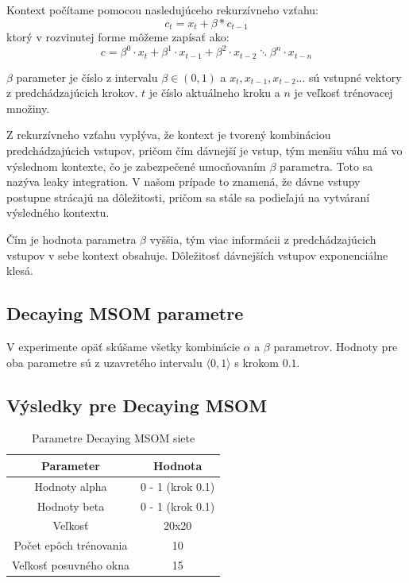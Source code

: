 Kontext počítame pomocou nasledujúceho rekurzívneho vzťahu:
\begin{equation} \label{dm_recursive}
    c_{t} = x_{t} + \beta * c_{t-1}
\end{equation}
ktorý v rozvinutej forme môžeme zapísať ako:
\begin{equation}
	c = \beta^{0} \cdot x_{t} + \beta^{1} \cdot x_{t-1} + 
	\beta^{2} \cdot x_{t-2} \ddots \beta^{n} \cdot x_{t-n}
\end{equation}

$\beta$ parameter je číslo z intervalu $\beta \in (0, 1)$ a
$x_t, x_{t-1}, x_{t-2} ...$ sú vstupné vektory z predchádzajúcich krokov.
$t$ je číslo aktuálneho kroku a $n$ je veľkosť trénovacej množiny.

Z rekurzívneho vzťahu vyplýva, že kontext je tvorený kombináciou predchádzajúcich vstupov,
pričom čím dávnejší je vstup, tým menšiu váhu má vo výslednom kontexte, čo je zabezpečené umocňovaním
$\beta$ parametra. Toto sa nazýva leaky integration. V našom prípade
to znamená, že dávne vstupy postupne strácajú na dôležitosti, pričom sa stále sa podieľajú 
na vytváraní výsledného kontextu.

Čím je hodnota parametra $\beta$ vyššia, tým viac informácii z predchádzajúcich vstupov v sebe
kontext obsahuje. Dôležitosť dávnejších vstupov exponenciálne klesá.

\subsection{Decaying MSOM parametre}
V experimente opäť skúšame všetky kombinácie $\alpha$ a $\beta$ parametrov.
Hodnoty pre oba parametre sú z uzavretého intervalu $\langle0, 1\rangle$ s krokom $0.1$.

\subsection{Výsledky pre Decaying MSOM}
\begin{table}[h!]
    \centering
    \begin{tabular}{|c|c|} 
     \hline
     Parameter & Hodnota \\ 
     \hline\hline
     Hodnoty alpha & 0 - 1 (krok 0.1)  \\ 
     \hline
     Hodnoty beta & 0 - 1  (krok 0.1) \\ 
     \hline
     Veľkosť & 20x20  \\
     \hline
     Počet epôch trénovania & 10  \\
     \hline
     Veľkosť posuvného okna & 15 \\
     \hline
    \end{tabular}
    \caption{Parametre Decaying MSOM siete}
    \label{table:1}
    \end{table}
    
